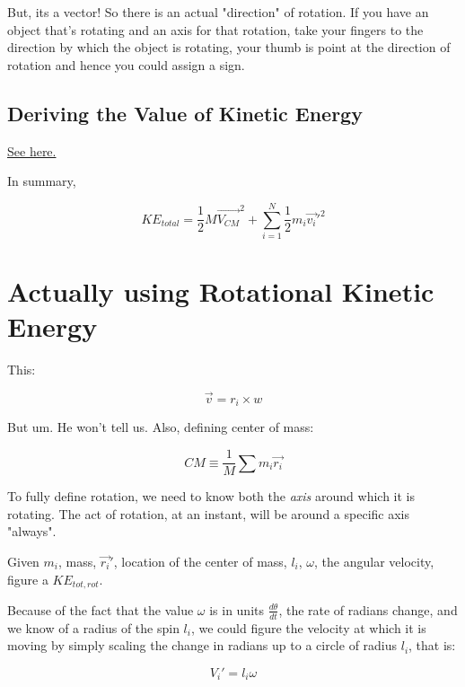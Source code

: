 \documentclass[letterpaper]{article}
\begin{document}
But, its a vector! So there is an actual "direction" of rotation. If you have an object that's rotating and an axis for that rotation, take your fingers to the direction by which the object is rotating, your thumb is point at the direction of rotation and hence you could assign a sign.

\subsection{Deriving the Value of Kinetic Energy}
\label{sec:org36d7a18}
\href{KBhPHYS360RotationalKineticEnergyDerivation.org}{See here.}

In summary,

\begin{equation}
     KE_{total} = \frac{1}{2} M \vec{V_{CM}}^2 + \sum^N_{i=1} \frac{1}{2}m_i\vec{v_i}'^2
\end{equation}


\section{Actually using Rotational Kinetic Energy}
\label{sec:orgdc670f8}
This:

\begin{equation}
    \vec{v} = r_i \times w
\end{equation}

But um. He won't tell us. Also, defining center of mass:

\begin{equation}
CM \equiv \frac{1}{M} \sum m_i \vec{r_i}
\end{equation}


To fully define rotation, we need to know both the \emph{axis} around which it is rotating. The act of rotation, at an instant, will be around a specific axis "always".

Given \(m_i\), mass, \(\vec{r_i}'\), location of the center of mass, \(l_i\), \(\omega\), the angular velocity, figure a \(KE_{tot,rot}\). 

Because of the fact that the value \(\omega\) is in units \(\frac{d\theta}{dt}\), the rate of radians change, and we know of a radius of the spin \(l_i\), we could figure the velocity at which it is moving by simply scaling the change in radians up to a circle of radius \(l_i\), that is:

\begin{equation}
    V_i' = l_i \omega 
\end{equation}
\end{document}
